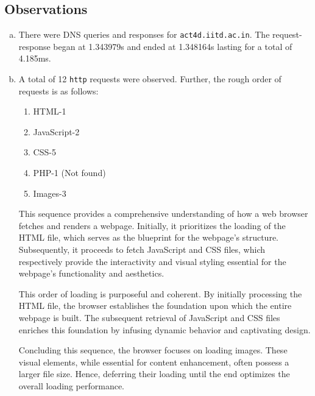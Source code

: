 \subsection*{Observations}
\begin{enumerate}[a. ]
    \item There were DNS queries and responses for {\tt act4d.iitd.ac.in}. The request-response began at 1.343979s and ended at 1.348164s lasting for a total of 4.185ms.
    \item A total of 12 {\tt http} requests were observed. Further, the rough order of requests is as follows:
        \begin{enumerate}
            \item HTML-1
            \item JavaScript-2
            \item CSS-5
            \item PHP-1 (Not found)
            \item Images-3
        \end{enumerate}
        This sequence provides a comprehensive understanding of how a web browser fetches and renders a webpage. Initially, it prioritizes the loading of the HTML file, which serves as the blueprint for the webpage's structure. Subsequently, it proceeds to fetch JavaScript and CSS files, which respectively provide the interactivity and visual styling essential for the webpage's functionality and aesthetics.

        This order of loading is purposeful and coherent. By initially processing the HTML file, the browser establishes the foundation upon which the entire webpage is built. The subsequent retrieval of JavaScript and CSS files enriches this foundation by infusing dynamic behavior and captivating design.

        Concluding this sequence, the browser focuses on loading images. These visual elements, while essential for content enhancement, often possess a larger file size. Hence, deferring their loading until the end optimizes the overall loading performance.


\end{enumerate}
